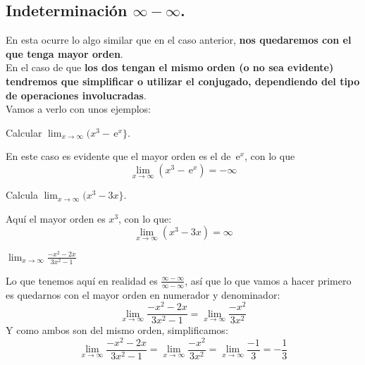 \documentclass[a4paper,11pt,answers]{exam}
\newcommand{\e}{\,\mathrm{e}}
\begin{document}
\subsection{Indeterminación $\boldsymbol{\infty - \infty}$.}
En esta ocurre lo algo similar que en el caso anterior, \textbf{nos quedaremos con el que tenga mayor orden}.\\
En el caso de que \textbf{los dos tengan el mismo orden (o no sea evidente) tendremos que simplificar o utilizar el conjugado, dependiendo del tipo de operaciones involucradas}.\\

Vamos a verlo con unos ejemplos:
\begin{questions}
\question Calcular $\lim_{x \to \infty} (x^3 - \e^x\}$.
\begin{solution}
En este caso es evidente que el mayor orden es el de $\e^x$, con lo que 
\[\lim_{x \to \infty} (x^3 - \e^x) = -\infty\]
\end{solution}

\question Calcula $\lim_{x \to \infty} (x^3 - 3x\}$.
\begin{solution}
Aquí el mayor orden es $x^3$, con lo que:
\[\lim_{x \to \infty} (x^3 - 3x) = \infty\]
\end{solution}

\question $\lim_{x \to \infty}\frac{-x^2 - 2x}{3x^2 - 1}$
\begin{solution}
Lo que tenemos aquí en realidad es $\frac{\infty - \infty}{\infty-\infty}$, así que lo que vamos a hacer primero es quedarnos con el mayor orden en numerador y denominador:
\[\lim_{x \to \infty}\frac{-x^2 - 2x}{3x^2 - 1}= \lim_{x \to \infty}\frac{-x^2 }{3x^2 }\]
Y como ambos son del mismo orden, simplificamos:
\[\lim_{x \to \infty}\frac{-x^2 - 2x}{3x^2 - 1}= \lim_{x \to \infty}\frac{-x^2 }{3x^2 } = \lim_{x \to \infty} \frac{-1}{3} = -\frac{1}{3}\]
\end{solution}


\end{questions}
\end{document}
